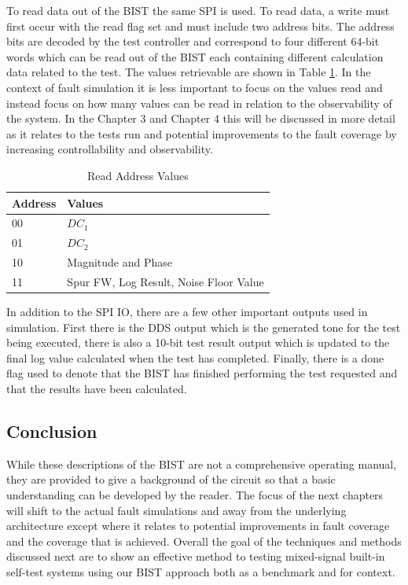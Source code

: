 \documentclass[12pt]{report}
\begin{document}
To read data out of the BIST the same SPI is used.  To read data, a write must first occur with the read flag set and must include two address bits.  The address bits are decoded by the test controller and correspond to four different 64-bit words which can be read out of the BIST each containing different calculation data related to the test.  The values retrievable are shown in Table \ref{tbl:readvals}.  In the context of fault simulation it is less important to focus on the values read and instead focus on how many values can be read in relation to the observability of the system.  In the Chapter 3 and Chapter 4 this will be discussed in more detail as it relates to the tests run and potential improvements to the fault coverage by increasing controllability and observability.  
\begin{table}
	\begin{center}
		\begin{tabular}{|l|l|}
			\hline
			Address & Values \\ \hline
			00 & $DC_1$ \\ \hline
			01 & $DC_2$ \\ \hline
			10 & Magnitude and Phase \\ \hline
			11 & Spur FW, Log Result, Noise Floor Value \\ \hline			
		\end{tabular}
	\end{center}
	\caption{Read Address Values}
	\label{tbl:readvals}
\end{table}

In addition to the SPI IO, there are a few other important outputs used in simulation.  First there is the DDS output which is the generated tone for the test being executed, there is also a 10-bit test result output which is updated to the final log value calculated when the test has completed.  Finally, there is a done flag used to denote that the BIST has finished performing the test requested and that the results have been calculated.  

\subsection{Conclusion}
While these descriptions of the BIST are not a comprehensive operating manual, they are provided to give a background of the circuit so that a basic understanding can be developed by the reader.  The focus of the next chapters will shift to the actual fault simulations and away from the underlying architecture except where it relates to potential improvements in fault coverage and the coverage that is achieved.  Overall the goal of the techniques and methods discussed next are to show an effective method to testing mixed-signal built-in self-test systems using our BIST approach both as a benchmark and for context.
\end{document}
